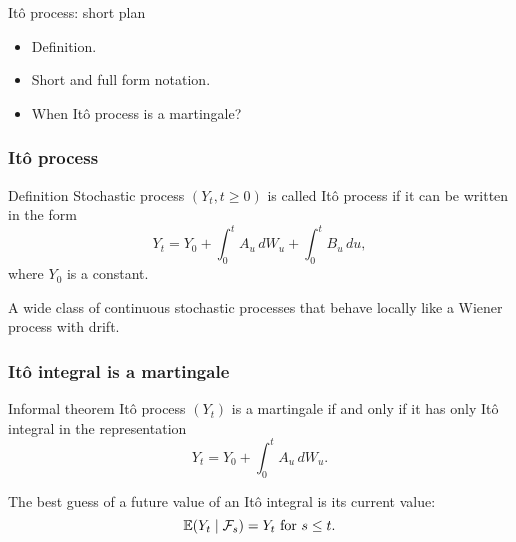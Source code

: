 


\begin{frame} %

    
    \end{frame}
    
    
    \begin{frame}{Itô process: short plan}
    
      \begin{itemize}[<+->]
        \item Definition.
        \item Short and full form notation.
        \item When Itô process is a martingale?
      \end{itemize}
    
    \end{frame}

\begin{frame}
    \frametitle{Itô process}

    \begin{block}{Definition\formalduck}
        Stochastic process $(Y_t, t\geq 0)$ is called \alert{Itô process} if it can be written in the form 
        \[
        Y_t = Y_0 + \int_0^t A_u \, dW_u + \int_0^t B_u \, du,
        \]
        where $Y_0$ is a constant.
    \end{block}

    \pause
    A wide class of continuous stochastic processes that behave \alert{locally} like a Wiener process with drift. 

\end{frame}


\begin{frame}
    \frametitle{Itô integral is a martingale}

    \begin{block}{Informal theorem\informalduck}
        Itô process $(Y_t)$ is a martingale if and only if it has only Itô integral in the representation
        \[
        Y_t = Y_0 + \int_0^t A_u \, dW_u.
        \]
    \end{block}

    \pause
    The best guess of a future value of an Itô integral is its current value:
    \pause
    \[
    \mathbb{E}(Y_t \mid \mathcal{F}_s) = Y_t \text{ for } s \leq t.
    \]

\end{frame}


